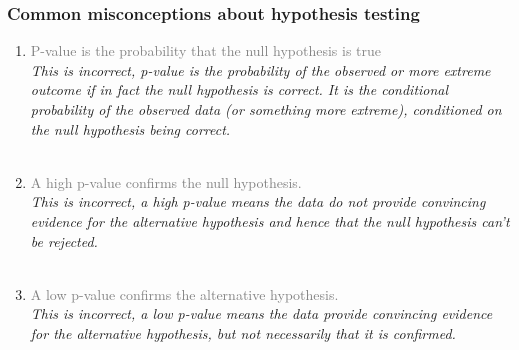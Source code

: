 \documentclass[slidestop,compress,mathserif,12pt,t,professionalfonts,xcolor=table]{beamer}
\begin{document}
\begin{frame}
\frametitle{Common misconceptions about hypothesis testing}

\begin{enumerate}

\item \textcolor{gray}{P-value is the probability that the null hypothesis is true} \\
\textit{This is incorrect, p-value is the probability of the observed or more extreme outcome if in fact the null hypothesis is correct. It is the conditional probability of the observed data (or something more extreme), conditioned on the null hypothesis being correct.} \\
$\:$ \\

\pause

\item  \textcolor{gray}{A high p-value confirms the null hypothesis.}\\
\textit{This is incorrect, a high p-value means the data do not provide convincing evidence for the alternative hypothesis and hence that the null hypothesis can't be rejected.} \\
$\:$ \\

\pause

\item   \textcolor{gray}{A low p-value confirms the alternative hypothesis.} \\
\textit{This is incorrect, a low p-value means the data provide convincing evidence for the alternative hypothesis, but not necessarily that it is confirmed.} \\

\end{enumerate}

\end{frame}




\end{document}
